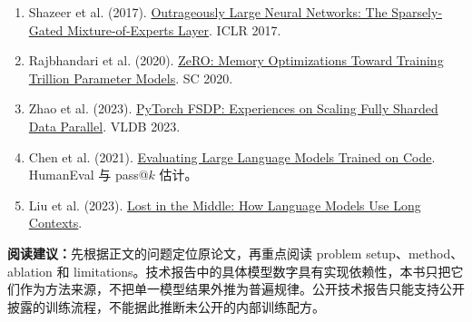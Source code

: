 \begin{enumerate}[leftmargin=2em]
  \item Shazeer et al. (2017). \href{https://arxiv.org/abs/1701.06538}{Outrageously Large Neural Networks: The Sparsely-Gated Mixture-of-Experts Layer}. ICLR 2017.
  \item Rajbhandari et al. (2020). \href{https://arxiv.org/abs/1910.02054}{ZeRO: Memory Optimizations Toward Training Trillion Parameter Models}. SC 2020.
  \item Zhao et al. (2023). \href{https://arxiv.org/abs/2304.11277}{PyTorch FSDP: Experiences on Scaling Fully Sharded Data Parallel}. VLDB 2023.
  \item Chen et al. (2021). \href{https://arxiv.org/abs/2107.03374}{Evaluating Large Language Models Trained on Code}. HumanEval 与 pass@$k$ 估计。
  \item Liu et al. (2023). \href{https://arxiv.org/abs/2307.03172}{Lost in the Middle: How Language Models Use Long Contexts}.
\end{enumerate}
\normalsize

\vspace{0.5em}
\noindent\textbf{阅读建议：}先根据正文的问题定位原论文，再重点阅读 problem setup、method、ablation 和 limitations。技术报告中的具体模型数字具有实现依赖性，本书只把它们作为方法来源，不把单一模型结果外推为普遍规律。公开技术报告只能支持公开披露的训练流程，不能据此推断未公开的内部训练配方。
